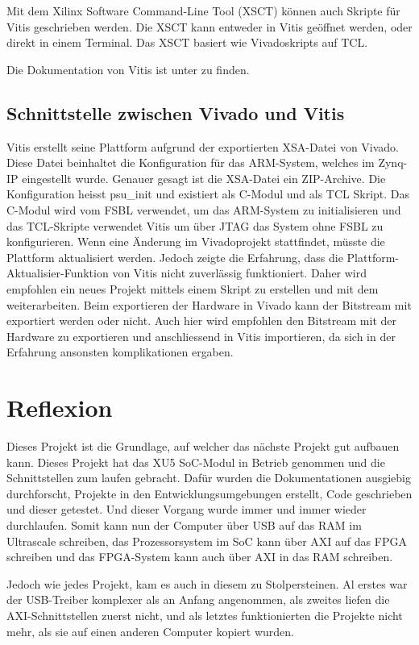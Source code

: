\documentclass{article}
\begin{document}
Mit dem Xilinx Software Command-Line Tool (XSCT) können auch Skripte für Vitis geschrieben werden. Die XSCT kann entweder in Vitis geöffnet werden, oder direkt in einem Terminal. Das XSCT basiert wie Vivadoskripts auf TCL.

Die Dokumentation von Vitis ist unter  zu finden.

\subsection{Schnittstelle zwischen Vivado und Vitis}
Vitis erstellt seine Plattform aufgrund der exportierten XSA-Datei von Vivado. Diese Datei beinhaltet die Konfiguration für das ARM-System, welches im Zynq-IP eingestellt wurde. Genauer gesagt ist die XSA-Datei ein ZIP-Archive. Die Konfiguration heisst psu\_init und existiert als C-Modul und als TCL Skript. Das C-Modul wird vom FSBL verwendet, um das ARM-System zu initialisieren und das TCL-Skripte verwendet Vitis um über JTAG das System ohne FSBL zu konfigurieren. 
Wenn eine Änderung im Vivadoprojekt stattfindet, müsste die Plattform aktualisiert werden. Jedoch zeigte die Erfahrung, dass die Plattform-Aktualisier-Funktion von Vitis nicht zuverlässig funktioniert. Daher wird empfohlen ein neues Projekt mittels einem Skript zu erstellen und mit dem weiterarbeiten. Beim exportieren der Hardware in Vivado kann der Bitstream mit exportiert werden oder nicht. Auch hier wird empfohlen den Bitstream mit der Hardware zu exportieren und anschliessend in Vitis importieren, da sich in der Erfahrung ansonsten komplikationen ergaben.


\section{Reflexion}
Dieses Projekt ist die Grundlage, auf welcher das nächste Projekt gut aufbauen kann. Dieses Projekt hat das XU5 SoC-Modul in Betrieb genommen und die Schnittstellen zum laufen gebracht. Dafür wurden die Dokumentationen ausgiebig durchforscht, Projekte in den Entwicklungsumgebungen erstellt, Code geschrieben und dieser getestet. Und dieser Vorgang wurde immer und immer wieder durchlaufen. Somit kann nun der Computer über USB auf das RAM im Ultrascale schreiben, das Prozessorsystem im SoC kann über AXI auf das FPGA schreiben und das FPGA-System kann auch über AXI in das RAM schreiben.

Jedoch wie jedes Projekt, kam es auch in diesem zu Stolpersteinen. Al erstes war der USB-Treiber komplexer als an Anfang angenommen, als zweites liefen die AXI-Schnittstellen zuerst nicht, und als letztes funktionierten die Projekte nicht mehr, als sie auf einen anderen Computer kopiert wurden.
\end{document}
